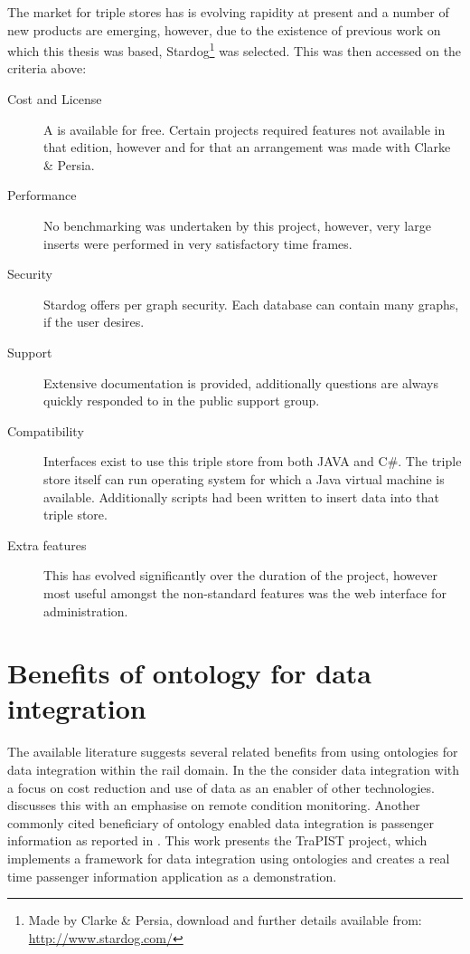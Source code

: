 The market for triple stores has is evolving rapidity at present and a number of new products are emerging, however, due to the existence of previous work on which this thesis was based, Stardog\footnote{Made by Clarke \& Persia, download and further details available from: \url{http://www.stardog.com/}} was selected. This was then accessed on the criteria above:

\begin{description}    
    \item[Cost and License] A  is available for free. Certain projects required features not available in that edition, however and for that an arrangement was made with Clarke \& Persia.
    \item[Performance] No benchmarking was undertaken by this project, however, very large inserts were performed in very satisfactory time frames.
    \item[Security] Stardog offers per graph security. Each database can contain many graphs, if the user desires.
    \item[Support] Extensive documentation is provided, additionally questions are always quickly responded to in the public support group.
    \item[Compatibility] Interfaces exist to use this triple store from both JAVA and C\#. The triple store itself can run operating system for which a Java virtual machine is available.  Additionally scripts had been written to insert data into that triple store.
    \item[Extra features] This has evolved significantly over the duration of the project, however most useful amongst the non-standard features was the web interface for administration. 
\end{description}


\section{Benefits of ontology for data integration}
\label{benefits}
The available literature suggests several related benefits from using ontologies for data integration within the rail domain. In the  the \citet{RDG2017} consider data integration with a focus on cost reduction and use of data as an enabler of other technologies. \citet{Tutcher2013} discusses this with an emphasise on remote condition monitoring. Another commonly cited beneficiary of ontology enabled data integration is passenger information as reported in  \citet{Verstichel2014}. This work presents the TraPIST project, which implements a framework for data integration using ontologies and creates a real time passenger information application as a demonstration.

